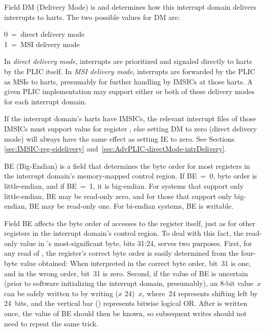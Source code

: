Field DM (Delivery Mode) is {\WARL} and determines how this interrupt
domain delivers interrupts to harts.
The two possible values for DM are:
\begin{displayLinesTable}
0~=~direct delivery mode\\
1~=~MSI delivery mode\\
\end{displayLinesTable}
In \emph{direct delivery mode}, interrupts are prioritized and signaled
directly to harts by the PLIC itself.
In \emph{MSI delivery mode}, interrupts are forwarded by the PLIC
as MSIs to harts, presumably for further handling by IMSICs at those
harts.
A given PLIC implementation may support either or both of these
delivery modes for each interrupt domain.

If the interrupt domain's harts have IMSICs, the relevant interrupt
files of those IMSICs must support value  for register
, else setting DM to zero (direct delivery mode) will
always have the same effect as setting IE to zero.
See Sections \ref{sec:IMSIC-reg-eidelivery}
and~\ref{sec:AdvPLIC-directMode-intrDelivery}.

BE (Big-Endian) is a {\WARL} field that determines the byte order for
most registers in the interrupt domain's memory-mapped control region.
If BE~=~0, byte order is little-endian, and if BE~=~1, it is
big-endian.
For {\RISCV} systems that support only little-endian, BE may be
read-only zero, and for those that support only big-endian, BE may be
read-only one.
For bi-endian systems, BE is writable.

Field BE affects the byte order of accesses to the 
register itself, just as for other registers in the interrupt domain's
control region.
To deal with this fact, the read-only value in 's
most-significant byte, bits 31:24, serves two purposes.
First, for any read of , the register's correct byte order
is easily determined from the four-byte value obtained:
When interpreted in the correct byte order, bit~31 is one, and in the
wrong order, bit~31 is zero.
Second, if the value of BE is uncertain (prior to software
initializing the interrupt domain, presumably), an \mbox{8-bit}
value~$x$ can be safely written to  by writing
\mbox{($x$\,\z{<<}\,24) \z{|} $x$}, where \mbox{\z{<<}\,24} represents
shifting left by 24~bits, and the vertical bar (\z{|}) represents
bitwise logical OR.
After  is written once, the value of BE should then be
known, so subsequent writes should not need to repeat the same trick.

